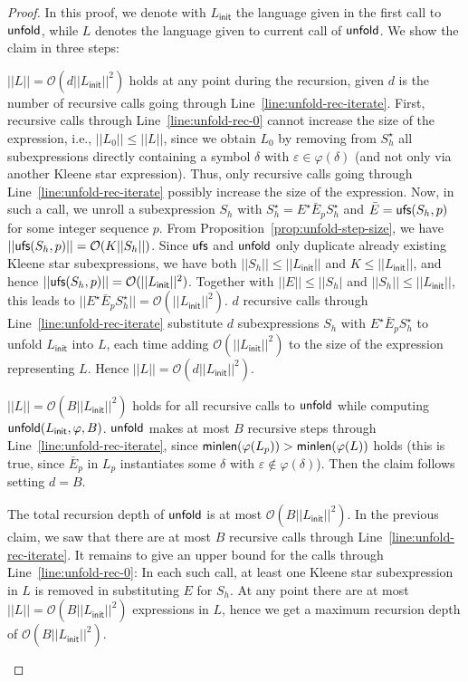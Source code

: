 \documentclass[envcountsame]{llncs}
\newcommand{\unfold}{\ensuremath{{\sf unfold}}\xspace}
\newcommand{\order}{\ensuremath{{\mathcal O}}\xspace}
\newcommand{\unfoldstep}{\ensuremath{{\sf ufs}}\xspace}
\newcommand{\minlength}{\ensuremath{{\sf minlen}}\xspace}
\newcommand{\Linit}{\ensuremath{L_\mathsf{init}}\xspace}
\begin{document}
\begin{proof}
  In this proof, we denote with \Linit the language given in the first
  call to \unfold, while $L$ denotes the language given to current
  call of \unfold. 
  We show the claim in three steps: 
  \begin{inparaenum}[\bfseries(1)]
  \item $||L||=\order(d||\Linit||^2)$ holds at any point during the
    recursion, given $d$ is the number of recursive calls going through
    Line~\ref{line:unfold-rec-iterate}.
First, recursive calls through Line~\ref{line:unfold-rec-0} cannot
    increase the size of the expression, i.e., $||L_0||\le ||L||$,
    since we obtain $L_0$ by removing from $S_h^\star$ all
    subexpressions directly containing a symbol $\delta$ with
    $\varepsilon\in\varphi(\delta)$ (and not only via another Kleene
    star expression).
Thus, only recursive calls going through
    Line~\ref{line:unfold-rec-iterate} possibly increase the size of
    the expression.
Now, in such a call, we unroll a subexpression $S_h$ with
    $S_h^\star=E^\star\bar E_pS_h^\star$ and $\bar
    E=\unfoldstep(S_h,p)$ for some integer sequence $p$.
From Proposition~\ref{prop:unfold-step-size}, we have
    $||\unfoldstep(S_h,p)||=\order(K||S_h||)$. 
Since \unfoldstep and \unfold only duplicate already existing
    Kleene star subexpressions, we have both $||S_h||\le ||\Linit||$
    and $K\le ||\Linit||$, and hence
    $||\unfoldstep(S_h,p)||=\order(||\Linit||^2)$.
Together with $||E||\le ||S_h|$ and $||S_h||\le ||\Linit||$, this
    leads to $||E^\star\bar E_pS_h^\star||=\order(||\Linit||^2)$.
$d$ recursive calls through Line~\ref{line:unfold-rec-iterate}
    substitute $d$ subexpressions $S_h$ with $E^\star\bar
    E_pS_h^\star$ to unfold $\Linit$ into $L$, each time adding
    $\order(||\Linit||^2)$ to the size of the expression representing
    $L$.
Hence $||L||=\order(d||\Linit||^2)$. 



  \item $||L||=\order(B||\Linit||^2)$ holds for all recursive calls to
    \unfold while computing $\unfold(\Linit,\varphi,B)$.
\unfold makes at most $B$ recursive steps through
    Line~\ref{line:unfold-rec-iterate}, since
    $\minlength(\varphi(L_p))>\minlength(\varphi(L))$ holds (this is
    true, since $\bar E_p$ in $L_p$ instantiates some $\delta$ with
    $\varepsilon\not\in\varphi(\delta)$).
Then the claim follows setting $d=B$.


  \item The total recursion depth of \unfold is at most
    $\order(B||\Linit||^2)$.
In the previous claim, we saw that there are at most $B$ recursive
    calls through Line~\ref{line:unfold-rec-iterate}.
It remains to give an upper bound for the calls through
    Line~\ref{line:unfold-rec-0}:
In each such call, at least one Kleene star subexpression in $L$
    is removed in substituting $E$ for $S_h$.
At any point there are at most $||L||=\order(B||\Linit||^2)$
    expressions in $L$, hence we get a maximum recursion depth of
    $\order(B||\Linit||^2)$. 



\end{inparaenum}
\end{proof}
\end{document}
